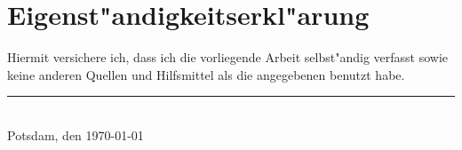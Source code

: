 \chapter*{Eigenst"andigkeitserkl"arung}

\thispagestyle{empty}

Hiermit versichere ich, dass ich die vorliegende Arbeit selbst"andig
verfasst sowie keine anderen Quellen und Hilfsmittel als die angegebenen
benutzt habe.\\[5\baselineskip]

\flushright
\rule{.4\textwidth}{0.4pt}\\[-1mm]
Potsdam, den \today\\
\makeatletter\@author\makeatother

\clearpage
\thispagestyle{empty}
~
